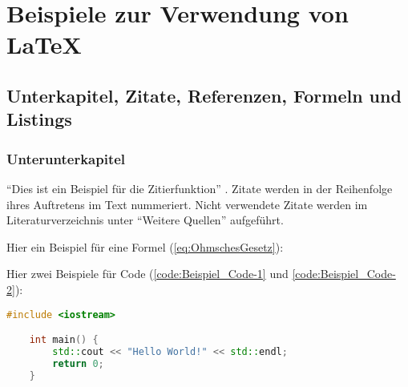 



\chapter{Beispiele zur Verwendung von LaTeX}
   
\section{Unterkapitel, Zitate, Referenzen, Formeln und Listings}\label{sec:Unterkapitel}

\subsection{Unterunterkapitel}

\enquote{Dies ist ein Beispiel für die Zitierfunktion} \cite[Vgl.][S. 1 ff.]{2024}. Zitate werden in der Reihenfolge ihres Auftretens im Text nummeriert. Nicht verwendete Zitate werden im Literaturverzeichnis unter \enquote{Weitere Quellen} aufgeführt.


Hier ein Beispiel für eine Formel (\autoref{eq:OhmschesGesetz}):

Hier zwei Beispiele für Code (\autoref{code:Beispiel_Code-1} und \autoref{code:Beispiel_Code-2}):

\begin{lstlisting}[language=C++, caption={Beispiel: direktes einfügen von Code}, label={code:Beispiel_Code-1}]
    #include <iostream>

    int main() {
        std::cout << "Hello World!" << std::endl;
        return 0;
    }
\end{lstlisting}



